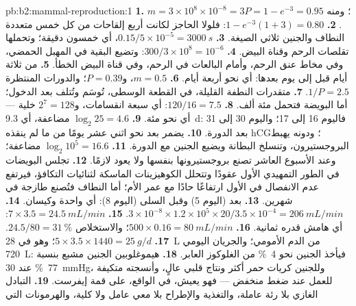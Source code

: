 \begin{solution}{pb:b2:mammal-reproduction:1}
\textbf{1.} $m = 3\times 10^{8}\times 10^{-8} = 3$؛ ومنه $P = 1 - e^{-3} =
0.95$.
\textbf{2.} $1 - e^{-3}(1 + 3) = 0.80$: فلولا الحاجز لكانت أربع
إلقاحات من كل خمس متعددة النطاف والجنين ثلاثي الصيغة.
\textbf{3.} $0.15/5\times 10^{-5} = \qty{3000}{s}$، أي خمسون دقيقة؛
وتحملها تقلصات الرحم وقناة البيض.
\textbf{4.} $300/3\times 10^{8} = 10^{-6}$: وتضيع البقية في المهبل
الحمضي، وفي مخاط عنق الرحم، وأمام البالعات في الرحم، وفي قناة
البيض الخطأ.
\textbf{5.} من ثلاثة أيام قبل  إلى يوم بعدها: أي نحو
أربعة أيام.
\textbf{6.} $m = 0.5$، و$P = 0.39$؛ والدورات المنتظرة $1/P = 2.5$.
\textbf{7.} متقدرات النطفة القليلة، في القطعة الوسطى، تُوسَم
وتُتلف بعد الدخول؛ أما البويضة فتحمل مئة ألف.
\textbf{8.} $120/16 = 7.5$: أي سبعة انقسامات، و$2^{7} = 128$ خلية ---
أي نحو مئة.
\textbf{9.} $\log_2 25 = 4.6$ مضاعفة، أي \qty{9.3}{d}: فاليوم 16 إلى 17؛
واليوم 30 إلى 31 بعد الدورة.
\textbf{10.} يضمر  بعد نحو اثني عشر يومًا من
 ما لم ينقذه hCG؛ ودونه يهبط البروجستيرون، وتنسلخ
البطانة ويضيع الجنين مع الدورة.
\textbf{11.} $\log_2 10^{5} = 16.6$ مضاعفة؛ وعند الأسبوع العاشر تصنع
 بروجستيرونها بنفسها ولا يعود 
لازمًا.
\textbf{12.} تجلس البويضات في الطور التمهيدي الأول عقودًا وتتحلل
الكوهيزينات الماسكة لثنائيات التكافؤ، فيرتفع عدم الانفصال في
 الأول ارتفاعًا حادًا مع عمر الأم؛ أما النطاف فتُصنع
طازجة في شهرين.
\textbf{13.} بعد  (اليوم 5) وقبل السلى (اليوم
8): أي  واحدة وكيسان.
\textbf{14.} $3\times 10^{-8}\times 1.2\times 10^{5}\times 20/3.5\times
10^{-4} = \qty{206}{mL/min}$.
\textbf{15.} $7\times 3.5 = \qty{24.5}{mL/min}$: أي هامش قدره ثمانية.
\textbf{16.} $500\times 0.16 = \qty{80}{mL/min}$؛ والاستخلاص
$24.5/80 = \qty{31}{\%}$.
\textbf{17.} $5\times 3.5\times 1440 = \qty{25}{g/d}$؛ وهو في \qty{28}{L}
من الدم الأمومي؛ والجريان اليومي \qty{720}{L}: فيأخذ الجنين نحو
\qty{4}{\%} من الغلوكوز العابر.
\textbf{18.} هيموغلوبين الجنين مشبع بنسبة \qty{77}{\%} عند
\qty{30}{mmHg}، وللجنين كريات حمر أكثر ونتاج قلبي
عالٍ، وأنسجته متكيفة للعمل عند ضغط منخفض --- فهو
يعيش، في الواقع، على قمة إيفرست.
\textbf{19.} التبادل الغازي بلا رئة عاملة، والتغذية
والإطراح بلا معي عامل ولا كلية، والهرمونات التي

\end{solution}
